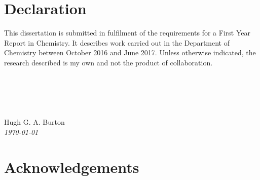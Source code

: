 \documentclass[a4paper,12pt,openright,oneside]{article}
\begin{document}
\cleardoublepage

\cleardoublepage
{}
\thispagestyle{empty}
\cleardoublepage
\section*{Declaration}

This dissertation is submitted in fulfilment of the requirements for a First Year Report in Chemistry. It describes work carried out in the Department of Chemistry between October 2016 and June 2017. Unless otherwise indicated, the research described is my own and not the product of collaboration.
\\
\\
\\
\\
\\
\\
Hugh G. A. Burton\\
\textit{\today}
\section*{Acknowledgements}

\newpage

\cleardoublepage

\newpage

\tableofcontents


\newpage
\cleardoublepage
\renewcommand\thepart{\arabic{part}}
\fancyhead{}
\rhead{\thepage}
\lhead{\leftmark}
\lfoot[]{}
\rfoot[]{}
\cfoot[]{}
\pagestyle{fancy}
\end{document}
